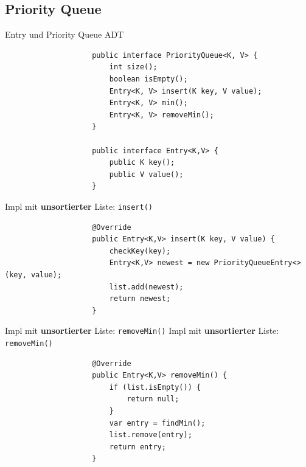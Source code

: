 \documentclass[a4paper, landscape, 8pt]{scrartcl}
\begin{document}
\begin{multicols*}{4}
            \subsection{Priority Queue}
                \textcolor{subsectioncolor}{Entry und Priority Queue ADT}
                \begin{lstlisting}
                    public interface PriorityQueue<K, V> {
                        int size();
                        boolean isEmpty();
                        Entry<K, V> insert(K key, V value);
                        Entry<K, V> min();
                        Entry<K, V> removeMin();
                    }

                    public interface Entry<K,V> {
                        public K key();
                        public V value();
                    }
                \end{lstlisting}
                \textcolor{subsectioncolor}{Impl mit {\bfseries unsortierter} Liste: \texttt{insert()}}
                \begin{lstlisting}
                    @Override
                    public Entry<K,V> insert(K key, V value) {
                        checkKey(key);
                        Entry<K,V> newest = new PriorityQueueEntry<>(key, value);
                        list.add(newest);
                        return newest;
                    }
                \end{lstlisting}
                \textcolor{subsectioncolor}{Impl mit {\bfseries unsortierter} Liste: \texttt{removeMin()}}
                \textcolor{subsectioncolor}{Impl mit {\bfseries unsortierter} Liste: \texttt{removeMin()}}
                \begin{lstlisting}
                    @Override
                    public Entry<K,V> removeMin() {
                        if (list.isEmpty()) {
                            return null;
                        }
                        var entry = findMin();
                        list.remove(entry);
                        return entry;
                    }


\end{lstlisting}
\end{multicols*}
\end{document}
